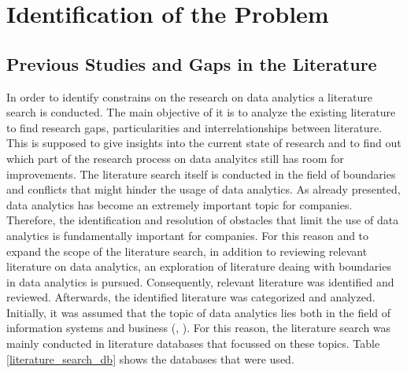 \newpage\section{Identification of the Problem}\label{sec:identification_of_the_problem}

\subsection{Previous Studies and Gaps in the Literature}


In order to identify constrains on the research on data analytics a literature search is conducted. The main objective of it is to analyze the existing literature to find research gaps, particularities and interrelationships between literature. This is supposed to give insights into the current state of research and to find out which part of the research process on data analyitcs still has room for improvements. The literature search itself is conducted in the field of boundaries and conflicts that might hinder the usage of data analytics. As already presented, data analytics has become an extremely important topic for companies. Therefore, the identification and resolution of obstacles that limit the use of data analytics is fundamentally important for companies. For this reason and to expand the scope of the literature search, in addition to reviewing relevant literature on data analytics, an exploration of literature deaing with boundaries in data analytics is pursued. Consequently, relevant literature was identified and reviewed. Afterwards, the identified literature was categorized and analyzed. Initially, it was assumed that the topic of data analytics lies both in the field of information systems and business (\cite{Abbasi.2016}, \cite{Levina.2005}). For this reason, the literature search was mainly conducted in literature databases that focussed on these topics. Table \ref{literature_search_db} shows the databases that were used. 

